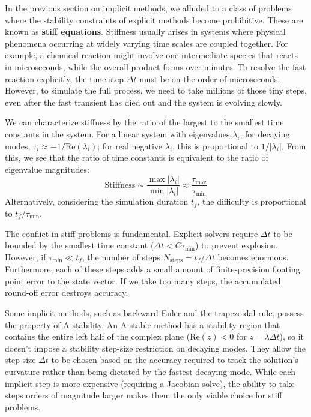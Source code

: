 In the previous section on implicit methods, we alluded to a class of problems where the stability constraints of explicit methods become prohibitive. These are known as \textbf{stiff equations}. Stiffness usually arises in systems where physical phenomena occurring at widely varying time scales are coupled together. For example, a chemical reaction might involve one intermediate species that reacts in microseconds, while the overall product forms over minutes. To resolve the fast reaction explicitly, the time step $\Delta t$ must be on the order of microseconds. However, to simulate the full process, we need to take millions of those tiny steps, even after the fast transient has died out and the system is evolving slowly.

We can characterize stiffness by the ratio of the largest to the smallest time constants in the system. For a linear system with eigenvalues $\lambda_i$, for decaying modes, $\tau_i \approx -1/\text{Re}(\lambda_i)$; for real negative $\lambda_i$, this is proportional to $1/|\lambda_i|$. From this, we see that the ratio of time constants is equivalent to the ratio of eigenvalue magnitudes:
\begin{equation}
    \text{Stiffness} \sim \frac{\max |\lambda_i|}{\min |\lambda_i|} \approx \frac{\tau_{\max}}{\tau_{\min}}
\end{equation}
Alternatively, considering the simulation duration $t_f$, the difficulty is proportional to $t_f / \tau_{\min}$.

The conflict in stiff problems is fundamental. Explicit solvers require $\Delta t$ to be bounded by the smallest time constant ($\Delta t < C \tau_{\min}$) to prevent explosion. However, if $\tau_{\min} \ll t_f$, the number of steps $N_{\text{steps}} = t_f / \Delta t$ becomes enormous. Furthermore, each of these steps adds a small amount of finite-precision floating point error to the state vector. If we take too many steps, the accumulated round-off error destroys accuracy.

Some implicit methods, such as backward Euler and the trapezoidal rule, possess the property of A-stability. An A-stable method has a stability region that contains the entire left half of the complex plane ($\text{Re}(z)<0$ for $z = \lambda \Delta t$), so it doesn't impose a stability step-size restriction on decaying modes. They allow the step size $\Delta t$ to be chosen based on the accuracy required to track the solution's curvature rather than being dictated by the fastest decaying mode. While each implicit step is more expensive (requiring a Jacobian solve), the ability to take steps orders of magnitude larger makes them the only viable choice for stiff problems.

